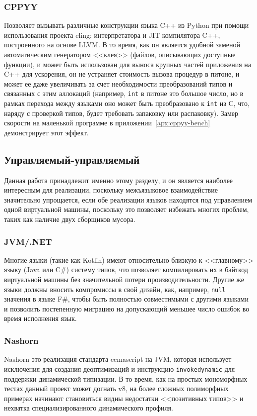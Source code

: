 \documentclass[times
]{itmo-student-thesis}
\begin{document}
\subsubsection{CPPYY}
Позволяет вызывать различные конструкции языка C++ из Python при помощи использования проекта cling: интерпретатора и JIT компилятора C++, построенного на основе LLVM. В то время, как он является удобной заменой автоматическим генератором <<клея>> (файлов, описывающих доступные функции), и может быть использован для выноса крупных частей приложения на C++ для ускорения, он не устраняет стоимость вызова процедур в питоне, и может ее даже увеличивать за счет необходимости преобразований типов и связанных с этим аллокаций (например, \texttt{int} в питоне это большое число, но в рамках перехода между языками оно может быть преобразовано к \texttt{int} из C, что, наряду с проверкой типов, будет требовать запаковку или распаковку). Замер скорости на маленькой программе в приложении~\ref{apx:cppyy-bench} демонстрирует этот эффект.

\subsection{Управляемый-управляемый}
Данная работа принадлежит именно этому разделу, и он является наиболее интересным для реализации, поскольку межъязыковое взаимодействие значительно упрощается, если обе реализации языков находятся под управлением одной виртуальной машины, поскольку это позволяет избежать многих проблем, таких как наличие двух сборщиков мусора.
\subsubsection{JVM/.NET}
Многие языки (такие как Kotlin) имеют относительно близкую к <<главному>> языку (Java или C\#) систему типов, что позволяет компилировать их в байткод виртуальной машины без значительной потери производительности. Другие же языки должны вносить компромиссы в свой дизайн, как, например, \texttt{null} значения в языке F\#, чтобы быть полностью совместимыми с другими языками и позволить постепенную миграцию на допускающий меньшее число ошибок во время исполнения язык.
\subsubsection{Nashorn}
Nashorn это реализация стандарта ecmascript на JVM, которая использует исключения для создания деоптимизаций и инструкцию \texttt{invokedynamic} для поддержки динамической типизации. В то время, как на простых мономорфных тестах данный проект может догнать v8, на более сложных полиморфных примерах начинают становиться видны недостатки <<позитивных типов>> и нехватка специализированного динамического профиля.
\end{document}

